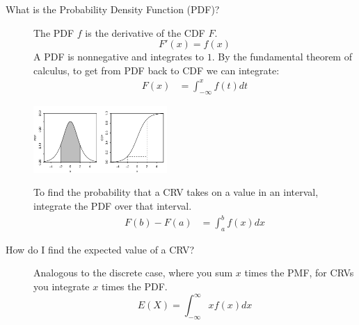 \documentclass[6pt, landscape]{article}
\begin{document}
\begin{multicols}{3}
\begin{description}
                \item[What is the Probability Density Function (PDF)?] The PDF $f$ is the derivative of the CDF $F$.
                      \[ F'(x) = f(x) \]
                      A PDF is nonnegative and integrates to $1$. By the fundamental theorem of calculus, to get from PDF back to CDF we can integrate:
                      \begin{align*}
                              F(x) & =  \int_{-\infty}^x f(t)dt
                      \end{align*}
                      \begin{minipage}{\linewidth}
                              \centering
                              \includegraphics[width=2in]{figures/Logisticpdfcdf.pdf}
                      \end{minipage}
                      To find the probability that a CRV takes on a value in an interval, integrate the PDF over that interval.
                      \begin{align*}
                              F(b) - F(a) & =  \int^b_a f(x)dx
                      \end{align*}



                \item[How do I find the expected value of a CRV?] Analogous to the discrete case, where you sum $x$ times the PMF, for CRVs you integrate $x$ times the PDF.
                      \[E(X) = \int^\infty_{-\infty}xf(x)dx \]
        \end{description}


        \label{lotus}

\end{multicols}
\end{document}
